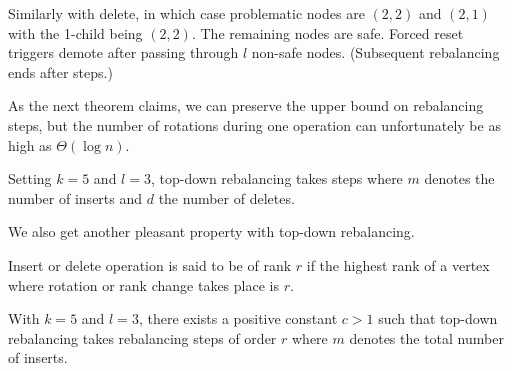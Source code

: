Similarly with delete, in which case problematic nodes are $(2,2)$ and $(2,1)$ with the 1-child being $(2,2)$. The remaining nodes are safe. Forced reset triggers demote after passing through $l$ non-safe nodes. (Subsequent rebalancing ends after  steps.)

As the next theorem claims, we can preserve the upper bound on rebalancing steps, but the number of rotations during one operation can unfortunately be as high as $\Theta(\log n)$.

\begin{thm}
Setting $k=5$ and $l=3$, top-down rebalancing takes  steps where $m$ denotes the number of inserts and $d$ the number of deletes.
\end{thm}

We also get another pleasant property with top-down rebalancing.

\begin{defn}
Insert or delete operation is said to be of rank $r$ if the highest rank of a vertex where rotation or rank change takes place is $r$.
\end{defn}

\begin{thm}
With $k=5$ and $l=3$, there exists a positive constant $c > 1$ such that top-down rebalancing takes  rebalancing steps of order $r$ where $m$ denotes the total number of inserts.
\end{thm}